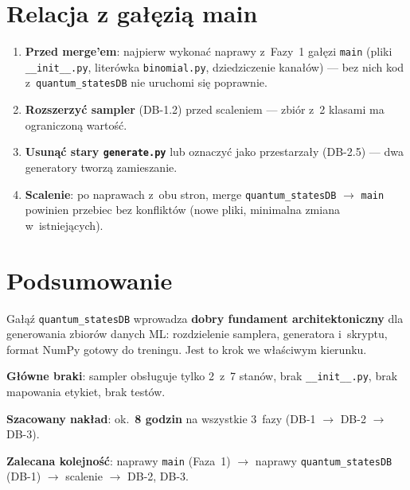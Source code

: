 \documentclass[12pt,a4paper]{article}
\begin{document}
\section{Relacja z gałęzią main}
\label{sec:relacja}

\begin{infobox}
\begin{enumerate}
    \item \textbf{Przed merge'em}: najpierw wykonać naprawy z~Fazy~1 gałęzi \texttt{main} (pliki \texttt{\_\_init\_\_.py}, literówka \texttt{binomial.py}, dziedziczenie kanałów) --- bez nich kod z~\texttt{quantum\_statesDB} nie uruchomi się poprawnie.
    \item \textbf{Rozszerzyć sampler} (DB-1.2) przed scaleniem --- zbiór z~2 klasami ma ograniczoną wartość.
    \item \textbf{Usunąć stary \texttt{generate.py}} lub oznaczyć jako przestarzały (DB-2.5) --- dwa generatory tworzą zamieszanie.
    \item \textbf{Scalenie}: po naprawach z~obu stron, merge \texttt{quantum\_statesDB} $\to$ \texttt{main} powinien przebiec bez konfliktów (nowe pliki, minimalna zmiana w~istniejących).
\end{enumerate}
\end{infobox}

\section{Podsumowanie}

Gałąź \texttt{quantum\_statesDB} wprowadza \textbf{dobry fundament architektoniczny} dla generowania zbiorów danych ML: rozdzielenie samplera, generatora i~skryptu, format NumPy gotowy do treningu. Jest to krok we właściwym kierunku.

\textbf{Główne braki}: sampler obsługuje tylko 2~z~7 stanów, brak \texttt{\_\_init\_\_.py}, brak mapowania etykiet, brak testów.

\textbf{Szacowany nakład}: ok.~\textbf{8 godzin} na wszystkie 3~fazy (DB-1 $\to$ DB-2 $\to$ DB-3).

\textbf{Zalecana kolejność}: naprawy \texttt{main} (Faza~1) $\to$ naprawy \texttt{quantum\_statesDB} (DB-1) $\to$ scalenie $\to$ DB-2, DB-3.

\printbibliography[title={Bibliografia}]
\end{document}
